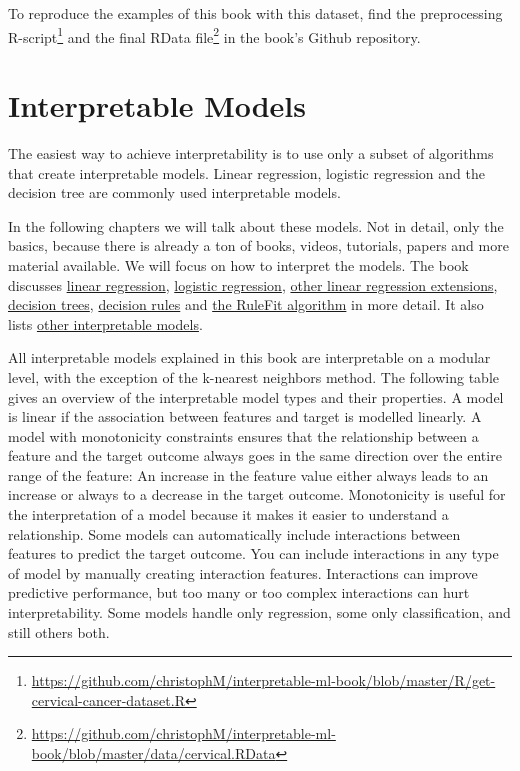 \documentclass[12pt,]{krantz}
\renewcommand{\href}[2]{#2\footnote{\url{#1}}}
\begin{document}
To reproduce the examples of this book with this dataset, find the
\href{https://github.com/christophM/interpretable-ml-book/blob/master/R/get-cervical-cancer-dataset.R}{preprocessing
R-script} and the
\href{https://github.com/christophM/interpretable-ml-book/blob/master/data/cervical.RData}{final
RData file} in the book's Github repository.

\hypertarget{simple}{\chapter{Interpretable Models}\label{simple}}

The easiest way to achieve interpretability is to use only a subset of
algorithms that create interpretable models. Linear regression, logistic
regression and the decision tree are commonly used interpretable models.

In the following chapters we will talk about these models. Not in
detail, only the basics, because there is already a ton of books,
videos, tutorials, papers and more material available. We will focus on
how to interpret the models. The book discusses
\protect\hyperlink{limo}{linear regression},
\protect\hyperlink{logistic}{logistic regression},
\protect\hyperlink{extend-lm}{other linear regression extensions},
\protect\hyperlink{tree}{decision trees},
\protect\hyperlink{rules}{decision rules} and
\protect\hyperlink{rulefit}{the RuleFit algorithm} in more detail. It
also lists \protect\hyperlink{other-interpretable}{other interpretable
models}.

All interpretable models explained in this book are interpretable on a
modular level, with the exception of the k-nearest neighbors method. The
following table gives an overview of the interpretable model types and
their properties. A model is linear if the association between features
and target is modelled linearly. A model with monotonicity constraints
ensures that the relationship between a feature and the target outcome
always goes in the same direction over the entire range of the feature:
An increase in the feature value either always leads to an increase or
always to a decrease in the target outcome. Monotonicity is useful for
the interpretation of a model because it makes it easier to understand a
relationship. Some models can automatically include interactions between
features to predict the target outcome. You can include interactions in
any type of model by manually creating interaction features.
Interactions can improve predictive performance, but too many or too
complex interactions can hurt interpretability. Some models handle only
regression, some only classification, and still others both.
\end{document}
